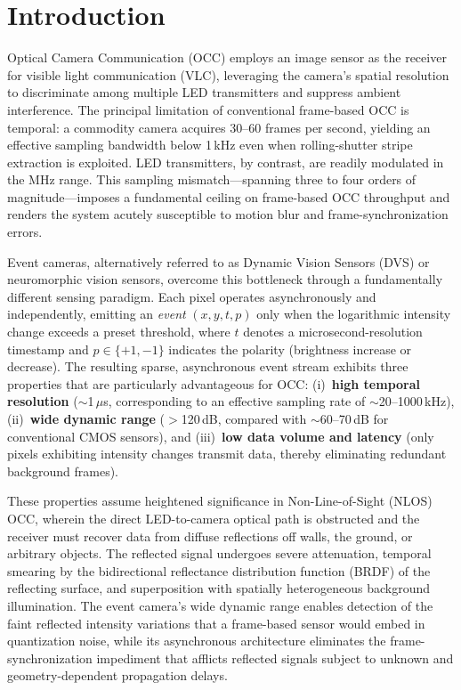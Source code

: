 \documentclass[10pt,a4paper]{article}
\begin{document}
\section{Introduction}
\label{sec:intro}

Optical Camera Communication (OCC) employs an image sensor as the
receiver for visible light communication (VLC), leveraging the camera's
spatial resolution to discriminate among multiple LED transmitters and
suppress ambient interference. The principal limitation of conventional
frame-based OCC is temporal: a commodity camera acquires 30--60 frames
per second, yielding an effective sampling bandwidth below 1\,kHz even
when rolling-shutter stripe extraction is exploited. LED transmitters,
by contrast, are readily modulated in the MHz range. This sampling
mismatch---spanning three to four orders of magnitude---imposes a
fundamental ceiling on frame-based OCC throughput and renders the system
acutely susceptible to motion blur and frame-synchronization errors.

Event cameras, alternatively referred to as Dynamic Vision Sensors (DVS)
or neuromorphic vision sensors, overcome this bottleneck through a
fundamentally different sensing paradigm. Each pixel operates
asynchronously and independently, emitting an \emph{event}
$(x, y, t, p)$ only when the logarithmic intensity change exceeds a
preset threshold, where $t$ denotes a microsecond-resolution timestamp
and $p \in \{+1, -1\}$ indicates the polarity (brightness increase or
decrease). The resulting sparse, asynchronous event stream exhibits
three properties that are particularly advantageous for OCC:
(i)~\textbf{high temporal resolution} ($\sim$1\,$\mu$s, corresponding to
an effective sampling rate of $\sim$20--1000\,kHz), (ii)~\textbf{wide
dynamic range} ($>$120\,dB, compared with $\sim$60--70\,dB for
conventional CMOS sensors), and (iii)~\textbf{low data volume and
latency} (only pixels exhibiting intensity changes transmit data,
thereby eliminating redundant background frames).

These properties assume heightened significance in Non-Line-of-Sight
(NLOS) OCC, wherein the direct LED-to-camera optical path is obstructed
and the receiver must recover data from diffuse reflections off walls,
the ground, or arbitrary objects. The reflected signal undergoes severe
attenuation, temporal smearing by the bidirectional reflectance
distribution function (BRDF) of the reflecting surface, and superposition
with spatially heterogeneous background illumination. The event camera's
wide dynamic range enables detection of the faint reflected intensity
variations that a frame-based sensor would embed in quantization noise,
while its asynchronous architecture eliminates the frame-synchronization
impediment that afflicts reflected signals subject to unknown and
geometry-dependent propagation delays.
\end{document}
